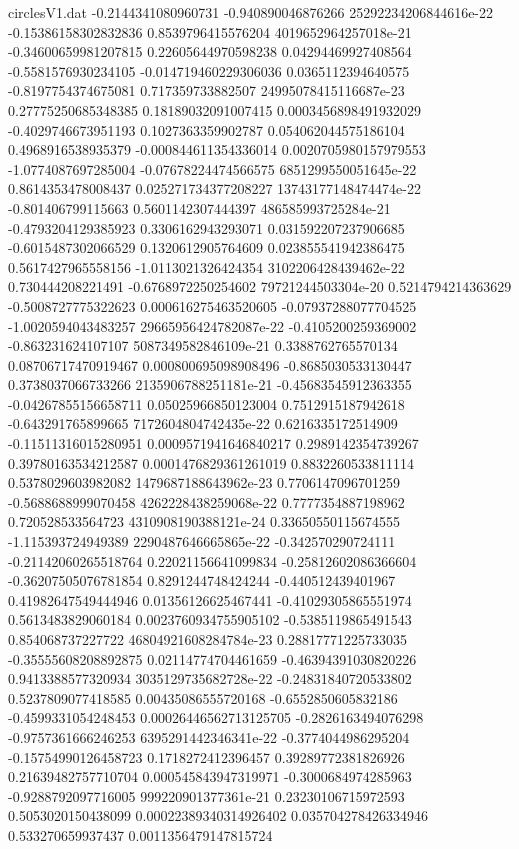 \begin{filecontents}{circlesV1.dat}
-0.2144341080960731	-0.940890046876266	25292234206844616e-22
-0.15386158302832836	0.8539796415576204	4019652964257018e-21
-0.34600659981207815	0.22605644970598238	0.04294469927408564
-0.5581576930234105	-0.014719460229306036	0.0365112394640575
-0.8197754374675081	0.717359733882507	24995078415116687e-23
0.27775250685348385	0.18189032091007415	0.0003456898491932029
-0.4029746673951193	0.1027363359902787	0.054062044575186104
0.4968916538935379	-0.000844611354336014	0.0020705980157979553
-1.0774087697285004	-0.07678224474566575	6851299550051645e-22
0.8614353478008437	0.025271734377208227	13743177148474474e-22
-0.801406799115663	0.5601142307444397	486585993725284e-21
-0.4793204129385923	0.3306162943293071	0.031592207237906685
-0.6015487302066529	0.1320612905764609	0.023855541942386475
0.5617427965558156	-1.0113021326424354	3102206428439462e-22
0.730444208221491	-0.6768972250254602	79721244503304e-20
0.5214794214363629	-0.5008727775322623	0.000616275463520605
-0.07937288077704525	-1.0020594043483257	29665956424782087e-22
-0.4105200259369002	-0.863231624107107	5087349582846109e-21
0.3388762765570134	0.08706717470919467	0.000800695098908496
-0.8685030533130447	0.3738037066733266	2135906788251181e-21
-0.45683545912363355	-0.04267855156658711	0.05025966850123004
0.7512915187942618	-0.643291765899665	7172604804742435e-22
0.6216335172514909	-0.11511316015280951	0.0009571941646840217
0.2989142354739267	0.39780163534212587	0.0001476829361261019
0.8832260533811114	0.5378029603982082	1479687188643962e-23
0.7706147096701259	-0.5688688999070458	4262228438259068e-22
0.7777354887198962	0.720528533564723	4310908190388121e-24
0.33650550115674555	-1.115393724949389	2290487646665865e-22
-0.342570290724111	-0.21142060265518764	0.22021156641099834
-0.25812602086366604	-0.36207505076781854	0.8291244748424244
-0.440512439401967	0.41982647549444946	0.01356126625467441
-0.41029305865551974	0.5613483829060184	0.0023760934755905102
-0.5385119865491543	0.854068737227722	46804921608284784e-23
0.28817771225733035	-0.35555608208892875	0.02114774704461659
-0.46394391030820226	0.9413388577320934	3035129735682728e-22
-0.24831840720533802	0.5237809077418585	0.00435086555720168
-0.6552850605832186	-0.4599331054248453	0.00026446562713125705
-0.2826163494076298	-0.9757361666246253	6395291442346341e-22
-0.3774044986295204	-0.15754990126458723	0.1718272412396457
0.39289772381826926	0.21639482757710704	0.000545843947319971
-0.3000684974285963	-0.9288792097716005	999220901377361e-21
0.23230106715972593	0.5053020150438099	0.00022389340314926402
0.035704278426334946	0.533270659937437	0.0011356479147815724

\end{filecontents}
